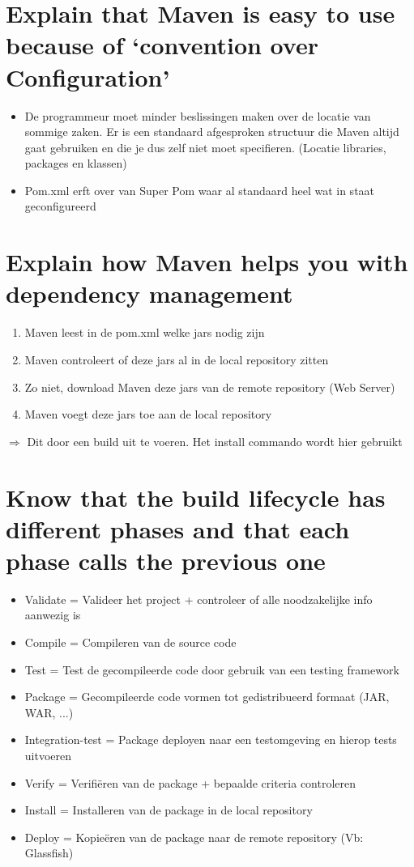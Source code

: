 
\section{Explain that Maven is easy to use because of ‘convention over Configuration’}

\begin{itemize}
	\item De programmeur moet minder beslissingen maken over de locatie van sommige zaken. Er is een standaard afgesproken structuur die Maven altijd gaat gebruiken en die je dus zelf niet moet specifieren. (Locatie libraries, packages en klassen)
	\item Pom.xml erft over van Super Pom waar al standaard heel wat in staat geconfigureerd
\end{itemize}

\section{Explain how Maven helps you with dependency management}
\begin{enumerate}
	\item Maven leest in de pom.xml welke jars nodig zijn
	\item Maven controleert of deze jars al in de local repository zitten
	\item Zo niet, download Maven deze jars van de remote repository (Web Server)
	\item Maven voegt deze jars toe aan de local repository
\end{enumerate}

$\Rightarrow$ Dit door een build uit te voeren. Het install commando wordt hier gebruikt

\section{Know that the build lifecycle has different phases and that each phase calls the previous one}

\begin{itemize}
	\item Validate = Valideer het project + controleer of alle noodzakelijke info aanwezig is
	\item Compile = Compileren van de source code
	\item Test = Test de gecompileerde code door gebruik van een testing framework
	\item Package =  Gecompileerde code vormen tot gedistribueerd formaat (JAR, WAR, ...)
	\item Integration-test = Package deployen naar een testomgeving en hierop tests uitvoeren
	\item Verify = Verifiëren van de package + bepaalde criteria controleren
	\item Install = Installeren van de package in de local repository
	\item Deploy = Kopieëren van de package naar de remote repository (Vb: Glassfish)
\end{itemize}

